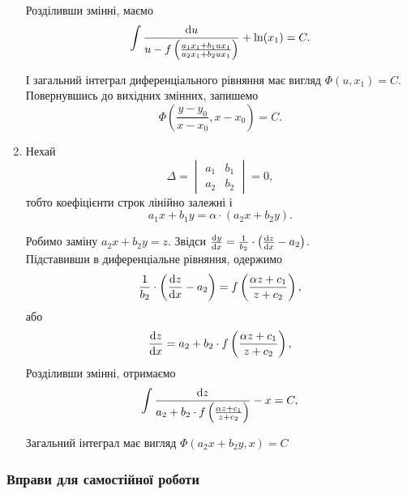 \begin{enumerate}
	Розділивши змінні, маємо
	\begin{equation}
		\label{eq:1.35}
		\int \frac{\mathop{}\!\mathrm{d} u}{u - f \left( \frac{a_1 x_1 + b_1 u x_1}{a_2 x_1 + b_2 u x_1} \right)} + \ln (x_1) = C.
	\end{equation}

	І загальний інтеграл диференціального рівняння має вигляд $\Phi(u, x_1) = C$. Повернувшись до вихідних змінних, запишемо
	\begin{equation}
		\label{eq:1.36}
		\Phi \left( \frac{y - y_0}{x - x_0}, x - x_0 \right) = C.
	\end{equation}

	\item Нехай 
	\begin{equation}
		\label{eq:1.37}
		\Delta = \begin{vmatrix} a_1 & b_1 \\ a_2 & b_2 \end{vmatrix} = 0,
	\end{equation}
	тобто коефіцієнти строк лінійно залежні і
	\begin{equation}
		\label{eq:1.38}
		a_1 x + b_1 y = \alpha \cdot (a_2 x + b_2 y).
	\end{equation}

	Робимо заміну $a_2 x + b_2 y = z$. Звідси $\frac{\mathop{}\!\mathrm{d} y}{\mathop{}\!\mathrm{d} x} = \frac{1}{b_2} \cdot \left( \frac{\mathop{}\!\mathrm{d} z}{\mathop{}\!\mathrm{d} x} - a_2 \right)$. \\

	Підставивши в диференціальне рівняння, одержимо
	\begin{equation}
		\label{eq:1.39}
		\frac{1}{b_2} \cdot \left( \frac{\mathop{}\!\mathrm{d} z}{\mathop{}\!\mathrm{d} x} - a_2 \right) = f \left ( \frac{\alpha z + c_1}{z + c_2} \right),
	\end{equation}
	або
	\begin{equation}
		\label{eq:1.40}
		\frac{\mathop{}\!\mathrm{d} z}{\mathop{}\!\mathrm{d} x} = a_2 + b_2 \cdot f \left ( \frac{\alpha z + c_1}{z + c_2} \right),
	\end{equation}
	Розділивши змінні, отримаємо
	\begin{equation}
		\label{eq:1.41}
		\int \frac{\mathop{}\!\mathrm{d} z}{a_2 + b_2 \cdot f \left ( \frac{\alpha z + c_1}{z + c_2} \right)} - x = C,
	\end{equation}

	Загальний інтеграл має вигляд $\Phi(a_2 x + b_2 y, x) = C$
\end{enumerate}

\subsubsection{Вправи для самостійної роботи}

